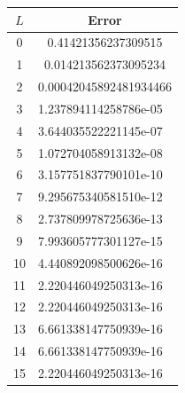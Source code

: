 \documentclass[12pt, a4paper]{article}
\begin{document}
\begin{minipage}{\textwidth}\centering
	\begin{tabular}{|l|l|}
	\hline
	\multicolumn{1}{|c|}{$L$} & \multicolumn{1}{c|}{Error}                  \\ \hline
	\multicolumn{1}{|c|}{0}   & \multicolumn{1}{c|}{0.41421356237309515}    \\ \hline
	\multicolumn{1}{|c|}{1}   & \multicolumn{1}{c|}{0.014213562373095234}   \\ \hline
	\multicolumn{1}{|c|}{2}   & \multicolumn{1}{c|}{0.00042045892481934466} \\ \hline
	\multicolumn{1}{|c|}{3}   & 1.237894114258786e-05						 \\ \hline
	\multicolumn{1}{|c|}{4}   & 3.644035522221145e-07                       \\ \hline
	\multicolumn{1}{|c|}{5}   & 1.072704058913132e-08                       \\ \hline
	\multicolumn{1}{|c|}{6}   & 3.157751837790101e-10                      \\ \hline
	\multicolumn{1}{|c|}{7}   & 9.295675340581510e-12                        \\ \hline
	\multicolumn{1}{|c|}{8}   & 2.737809978725636e-13                       \\ \hline
	\multicolumn{1}{|c|}{9}   & 7.993605777301127e-15                       \\ \hline
	10                        & 4.440892098500626e-16                       \\ \hline
	11                        & 2.220446049250313e-16                       \\ \hline
	12                        & 2.220446049250313e-16                       \\ \hline
	13                        & 6.661338147750939e-16                       \\ \hline
	14                        & 6.661338147750939e-16                       \\ \hline
	15                        & 2.220446049250313e-16                       \\ \hline
	\end{tabular}
\end{minipage}
\vspace{0.3cm}
\end{document}
